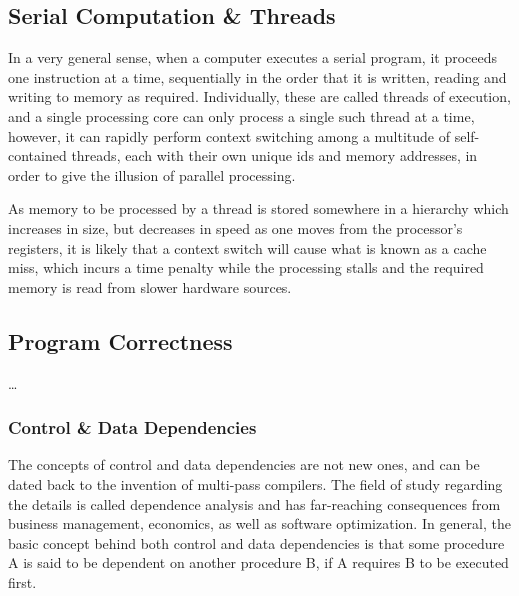 %
%
%
%
\subsection{Serial Computation \& Threads}
In a very general sense, when a computer executes a serial program, it proceeds one instruction at a time, sequentially in the order that it is written, reading and writing to memory as required. Individually, these are called threads of execution, and a single processing core can only process a single such thread at a time, however, it can rapidly perform context switching among a multitude of self-contained threads, each with their own unique ids and memory addresses, in order to give the illusion of parallel processing.

As memory to be processed by a thread is stored somewhere in a hierarchy which increases in size, but decreases in speed as one moves from the processor's registers, it is likely that a context switch will cause what is known as a cache miss, which incurs a time penalty while the processing stalls and the required memory is read from slower hardware sources.



%
%
%
%
\subsection{Program Correctness}
\ldots

%
%
\subsubsection{Control \& Data Dependencies}
\label{ch2sPPssCS}
The concepts of control and data dependencies are not new ones, and can be dated back to the invention of multi-pass compilers. The field of study regarding the details is called dependence analysis and has far-reaching consequences from business management, economics, as well as software optimization. In general, the basic concept behind both control and data dependencies is that some procedure A is said to be dependent on another procedure B, if A requires B to be executed first.


